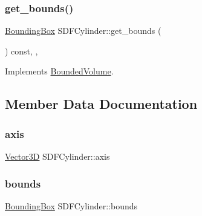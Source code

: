 \mbox{\label{classSDFCylinder_a45fafcbf4f71ed9b45d7ab09579c734c}} 
\subsubsection{\texorpdfstring{get\_bounds()}{get\_bounds()}}
{\footnotesize\ttfamily \mbox{\hyperlink{classBoundingBox}{Bounding\+Box}} S\+D\+F\+Cylinder\+::get\+\_\+bounds (\begin{DoxyParamCaption}{ }\end{DoxyParamCaption}) const\hspace{0.3cm}{\ttfamily [inline]}, {\ttfamily [override]}, {\ttfamily [virtual]}}



Implements \mbox{\hyperlink{classBoundedVolume_a281168c4d827c38b46e639f6e4991a9e}{Bounded\+Volume}}.



\subsection{Member Data Documentation}
\mbox{\label{classSDFCylinder_a0120c881204422391fd52fa5215512ab}} 
\subsubsection{\texorpdfstring{axis}{axis}}
{\footnotesize\ttfamily \mbox{\hyperlink{classVector3D}{Vector3D}} S\+D\+F\+Cylinder\+::axis\hspace{0.3cm}{\ttfamily [private]}}

\mbox{\label{classSDFCylinder_a4a25bf70750daa3248c900e7f1bb8b5f}} 
\subsubsection{\texorpdfstring{bounds}{bounds}}
{\footnotesize\ttfamily \mbox{\hyperlink{classBoundingBox}{Bounding\+Box}} S\+D\+F\+Cylinder\+::bounds\hspace{0.3cm}{\ttfamily [private]}}

